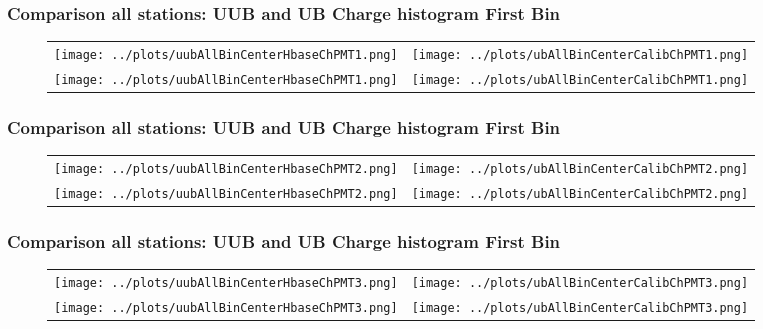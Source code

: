 \documentclass[aspectratio=169]{beamer}
\begin{document}

\begin{frame}
	\frametitle{Comparison all stations: UUB and UB Charge histogram First Bin}
	
	\begin{figure}
		\centering
		\begin{tabularx}{\textwidth}{CC}
      \texttt{[image: ../plots/uubAllBinCenterHbaseChPMT1.png]}
			&
			\texttt{[image: ../plots/ubAllBinCenterCalibChPMT1.png]}
      \\
      \texttt{[image: ../plots/uubAllBinCenterHbaseChPMT1.png]}
			&
			\texttt{[image: ../plots/ubAllBinCenterCalibChPMT1.png]}
		\end{tabularx}
	\end{figure}
\end{frame}

\begin{frame}
	\frametitle{Comparison all stations: UUB and UB Charge histogram First Bin}
	
	\begin{figure}
		\centering
		\begin{tabularx}{\textwidth}{CC}
      \texttt{[image: ../plots/uubAllBinCenterHbaseChPMT2.png]}
			&
			\texttt{[image: ../plots/ubAllBinCenterCalibChPMT2.png]}
			\\
			\texttt{[image: ../plots/uubAllBinCenterHbaseChPMT2.png]}
			&
			\texttt{[image: ../plots/ubAllBinCenterCalibChPMT2.png]}
		\end{tabularx}
	\end{figure}
\end{frame}


\begin{frame}
	\frametitle{Comparison all stations: UUB and UB Charge histogram First Bin}
	
	\begin{figure}
		\centering
		\begin{tabularx}{\textwidth}{CC}
      \texttt{[image: ../plots/uubAllBinCenterHbaseChPMT3.png]}
			&
			\texttt{[image: ../plots/ubAllBinCenterCalibChPMT3.png]}
			\\
			\texttt{[image: ../plots/uubAllBinCenterHbaseChPMT3.png]}
			&
			\texttt{[image: ../plots/ubAllBinCenterCalibChPMT3.png]}
		\end{tabularx}
	\end{figure}
\end{frame}


\end{document}
